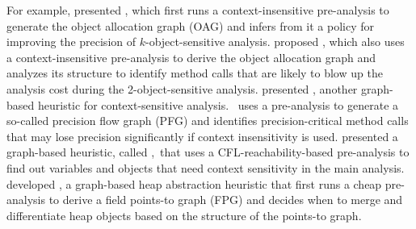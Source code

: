 For example,
\cite{TanLX16} presented \Bean, which first runs a context-insensitive
pre-analysis to generate the object allocation graph (OAG)
and infers from it a policy  for improving the precision of $k$-object-sensitive analysis.
\cite{Li2018b} proposed \Scaler, which also uses a context-insensitive pre-analysis to derive the object allocation graph and analyzes its structure to identify method calls that are likely to blow up the analysis cost during the 2-object-sensitive analysis.
\cite{Li2018a} presented \Zipper, another graph-based heuristic for context-sensitive analysis.
\Zipper~uses a pre-analysis to generate a so-called precision flow graph (PFG)
and identifies precision-critical method calls that may lose precision significantly if context insensitivity is used.
 \cite{Lu2019} presented
a graph-based heuristic, called \Eagle,~that uses a CFL-reachability-based pre-analysis to find out variables and objects that need
context sensitivity in the main analysis.
\cite{Tan2017} developed \Mahjong, a graph-based heap
abstraction heuristic that first runs a cheap pre-analysis to derive a field points-to graph (FPG) and decides when to merge and differentiate heap objects based on the structure of the points-to graph.

